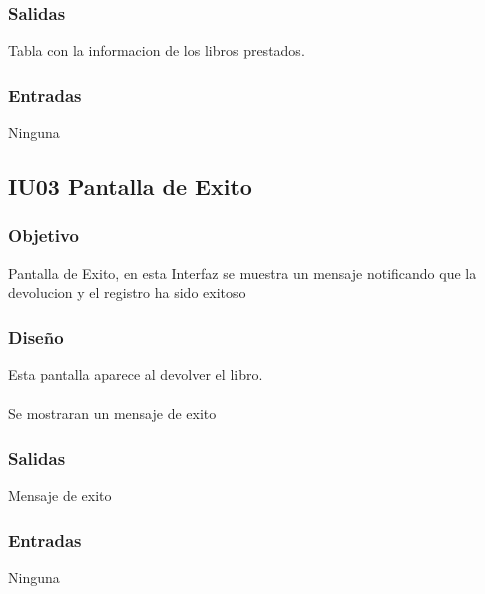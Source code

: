 
\subsubsection{Salidas}
	\begin{Citemize}
		\item Tabla con la informacion de los libros prestados. 
	\end{Citemize}
	
\subsubsection{Entradas}
	\begin{Citemize}
		\item Ninguna 
	\end{Citemize}







\subsection{IU03 Pantalla de Exito}

\subsubsection{Objetivo}
	Pantalla de Exito, en esta Interfaz se muestra un mensaje notificando que la devolucion y el registro ha sido exitoso  

\subsubsection{Diseño}
	Esta pantalla aparece al devolver el libro.  \\\\
	Se mostraran un mensaje de exito



\subsubsection{Salidas}
	\begin{Citemize}
		\item Mensaje de exito
	\end{Citemize}
	
\subsubsection{Entradas}
	\begin{Citemize}
		\item Ninguna 
	\end{Citemize}




